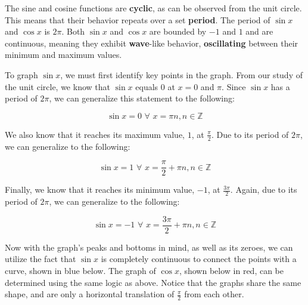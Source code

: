 \documentclass[11pt]{article}
\begin{document}
The sine and cosine functions are \textbf{cyclic}, as can be observed from the unit circle. This means that their behavior repeats over a set \textbf{period}. The period of $\sin x$ and $\cos x$ is $2\pi$. Both $\sin x$ and $\cos x$ are bounded by $-1$ and $1$ and are continuous, meaning they exhibit \textbf{wave}-like behavior, \textbf{oscillating} between their minimum and maximum values. 

To graph $\sin x$, we must first identify key points in the graph. From our study of the unit circle, we know that $\sin x$ equals $0$ at $x = 0$ and $\pi$. Since $\sin x$ has a period of $2\pi$, we can generalize this statement to the following:

\[ \sin x = 0 \,\, \forall \,\, x = \pi n, n \in \mathbb{Z} \]

We also know that it reaches its maximum value, $1$, at $\frac{\pi}{2}$. Due to its period of $2\pi$, we can generalize to the following:

\[ \sin x = 1 \,\, \forall \,\, x = \frac{\pi}{2} + \pi n, n \in \mathbb{Z} \]

Finally, we know that it reaches its minimum value, $-1$, at $\frac{3\pi}{2}$. Again, due to its period of $2\pi$, we can generalize to the following:

\[ \sin x = -1 \,\, \forall \,\, x = \frac{3\pi}{2} + \pi n, n \in \mathbb{Z} \]

Now with the graph's peaks and bottoms in mind, as well as its zeroes, we can utilize the fact that $\sin x$ is completely continuous to connect the points with a curve, shown in blue below. The graph of $\cos x$, shown below in red, can be determined using the same logic as above. Notice that the graphs share the same shape, and are only a horizontal translation of $\frac{\pi}{2}$ from each other. 

\begin{center}
\hspace{2cm}
\end{center}
\end{document}

